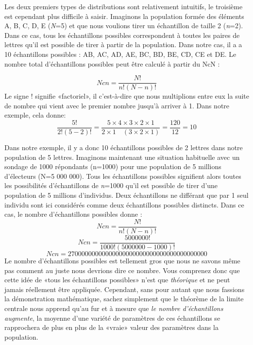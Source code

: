 \documentclass[
]{book}
\begin{document}
Les deux premiers types de distributions sont relativement intuitifs, le troisième est cependant plus difficile à saisir. Imaginons la population formée des éléments A, B, C, D, E (\emph{N}=5) et que nous voulions tirer un échantillon de taille 2 (\emph{n}=2). Dans ce cas, tous les échantillons possibles correspondent à toutes les paires de lettres qu'il est possible de tirer à partir de la population. Dans notre cas, il a a 10 échantillons possibles : AB, AC, AD, AE, BC, BD, BE, CD, CE et DE. Le nombre total d'échantillons possibles peut être calculé à partir du NcN :

\[Ncn=\frac{N!}{ n!(N-n)! }\]
Le signe ! signifie «factoriel», il c'est-à-dire que nous multiplions entre eux la suite de nombre qui vient avec le premier nombre jusqu'à arriver à 1. Dans notre exemple, cela donne:
\[\frac { 5! }{ 2!(5-2)! } =\frac { 5\times 4\times 3\times 2\times 1 }{ 2\times 1\quad (3\times 2\times 1) } =\frac { 120 }{ 12 } =10\]

Dans notre exemple, il y a donc 10 échantillons possibles de 2 lettres dans notre population de 5 lettres. Imaginons maintenant une situation habituelle avec un sondage de 1000 répondants (n=1000) pour une population de 5 millions d'électeurs (N=5 000 000). Tous les échantillons possibles signifient alors toutes les possibilités d'échantillons de \emph{n}=1000 qu'il est possible de tirer d'une population de 5 millions d'individus. Deux échantillons ne différant que par 1 seul individu sont ici considérés comme deux échantillons possibles distincts. Dans ce cas, le nombre d'échantillons possibles donne :
\[Ncn=\frac { N! }{ n!(N-n)! }\]
\[Ncn=\frac { 5 000 000! }{ 1000!(5 000 000-1000)! }\]
\[Ncn = 27 000 000 000 000 000 000 000 000 000 000 000 000 000\]
Le nombre d'échantillons possibles est tellement gros que nous ne savons même pas comment au juste nous devrions dire ce nombre. Vous comprenez donc que cette idée de «tous les échantillons possibles» n'est que \emph{théorique} et ne peut jamais réellement être appliquée. Cependant, sans pour autant que nous fassions la démonstration mathématique, sachez simplement que le théorème de la limite centrale nous apprend qu'au fur et à mesure que \emph{le nombre d'échantillons augmente}, la moyenne d'une variété de paramètres de ces échantillons se rapprochera de plus en plus de la «vraie» valeur des paramètres dans la population.
\end{document}
